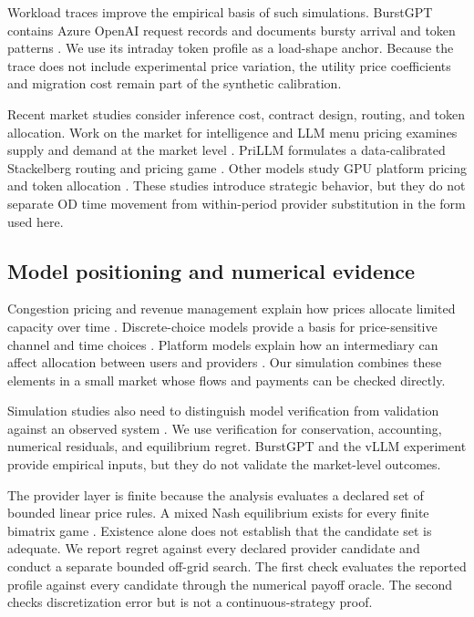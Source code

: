 \documentclass[11pt,a4paper]{article}
\begin{document}
Workload traces improve the empirical basis of such simulations. BurstGPT contains Azure OpenAI request records and documents bursty arrival and token patterns \cite{wang2025burstgpt}. We use its intraday token profile as a load-shape anchor. Because the trace does not include experimental price variation, the utility price coefficients and migration cost remain part of the synthetic calibration.

Recent market studies consider inference cost, contract design, routing, and token allocation. Work on the market for intelligence and LLM menu pricing examines supply and demand at the market level \cite{demirer2025emerging,bergemann2025menu}. PriLLM formulates a data-calibrated Stackelberg routing and pricing game \cite{guo2026prillm}. Other models study GPU platform pricing and token allocation \cite{yan2026stackelberg,cunningham2026token}. These studies introduce strategic behavior, but they do not separate OD time movement from within-period provider substitution in the form used here.

\subsection{Model positioning and numerical evidence}

Congestion pricing and revenue management explain how prices allocate limited capacity over time \cite{vickrey1969congestion,arnott1990bottleneck,gallego1994dynamic,elmaghraby2003dynamic}. Discrete-choice models provide a basis for price-sensitive channel and time choices \cite{mcfadden1974conditional,anderson1992discrete,train2009discrete}. Platform models explain how an intermediary can affect allocation between users and providers \cite{rochet2003platform}. Our simulation combines these elements in a small market whose flows and payments can be checked directly.

Simulation studies also need to distinguish model verification from validation against an observed system \cite{sargent2013verification}. We use verification for conservation, accounting, numerical residuals, and equilibrium regret. BurstGPT and the vLLM experiment provide empirical inputs, but they do not validate the market-level outcomes.

The provider layer is finite because the analysis evaluates a declared set of bounded linear price rules. A mixed Nash equilibrium exists for every finite bimatrix game \cite{nash1951noncooperative,fudenberg1991game}. Existence alone does not establish that the candidate set is adequate. We report regret against every declared provider candidate and conduct a separate bounded off-grid search. The first check evaluates the reported profile against every candidate through the numerical payoff oracle. The second checks discretization error but is not a continuous-strategy proof.
\end{document}
